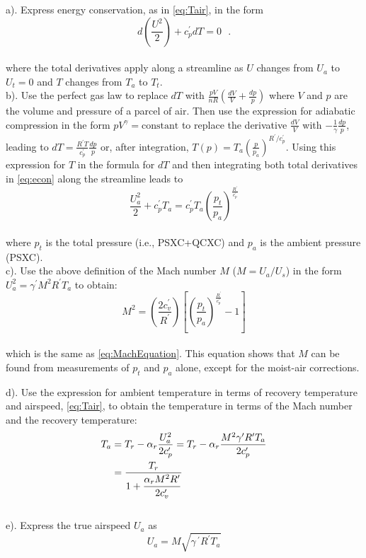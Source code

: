\documentclass[
  english,
]{book}
\begin{document}
a). Express energy conservation, as in \eqref{eq:Tair}, in the form\\
\begin{equation}
d\left(\frac{U^{2}}{2}\right)+c_{p}^{\prime}dT=0\,\,\,\,.
\label{eq:econ}
\end{equation}\\
where the total derivatives apply along a streamline as \(U\) changes from \(U_a\) to \(U_t=0\) and \(T\) changes from \(T_a\) to \(T_t\).\\
b). Use the perfect gas law to replace \(dT\) with \(\frac{pV}{nR}(\frac{dV}{V}+\frac{dp}{p})\) where \(V\) and \(p\) are the volume and pressure of a parcel of air. Then use the expression for adiabatic compression in the form \(pV^\gamma = \mathrm{constant}\) to replace the derivative \(\frac{dV}{V}\) with \(-\frac{1}{\gamma}\frac{dp}{p}\), leading to \(dT=\frac{R^{\prime}T}{c_{p}^{\prime}}\frac{dp}{p}\) or, after integration, \(T(p)=T_{a}\left(\frac{p}{p_{a}}\right)^{R^{\prime}/c_{p}^{\prime}}\). Using this expression for \(T\) in the formula for \(dT\) and then integrating both total derivatives in \eqref{eq:econ} along the streamline leads to\\
\begin{equation}
\frac{U_{a}^{2}}{2}+c_{p}^{\prime}T_{a}=c_{p}^{\prime}T_{a}\left(\frac{p_{t}}{p_{a}}\right)^{\frac{R^{\prime}}{c_{p}^{\prime}}}
\label{eq:Ua2}
\end{equation}\\
where \(p_t\) is the total pressure (i.e., PSXC+QCXC) and
\(p_a\) is the ambient pressure (PSXC).\\
c). Use the above definition of the Mach number \(M\) (\(M=U_a/U_s\)) in the form
\(U_a^2=\gamma^\prime M^2 R^\prime T_a\) to obtain:\\
\begin{equation}
M^{2}=\left(\frac{2c_{v}^{\prime}}{R^{\prime}}\right)\left[\left(\frac{p_{t}}{p_{a}}\right)^{\frac{R^{\prime}}{c_{p}^{\prime}}}-1\right]
\label{eq:M2}
\end{equation}\\
which is the same as \eqref{eq:MachEquation}. This equation shows that \(M\) can be found from measurements of \(p_t\) and \(p_a\) alone, except for the moist-air corrections.

d). Use the expression for ambient temperature in terms of recovery temperature and airspeed, \eqref{eq:Tair}, to obtain the temperature in terms of the Mach number and the recovery temperature:\\
\begin{align}
T_{a} & = T_{r}-\alpha_{r}\frac{U_{a}^{2}}{2c_{p}^{\prime}}=T_{r}-\alpha_{r}\frac{M^{2}\gamma^{\prime}R^{\prime}T_{a}}{2c_{p}^{\prime}}\notag\\  
& = \frac{T_{r}}{1+\dfrac{\alpha_{r}M^{2}R^{\prime}}{2c_{v}^{\prime}}}  
\label{eq:TaEQ}
\end{align}
\\
e). Express the true airspeed \(U_a\) as\\
\begin{equation}
U_{a}=M\sqrt{\gamma\,^{\prime}R^{\prime}T_{a}}
\label{eq:UaFinal}
\end{equation}
\end{document}
